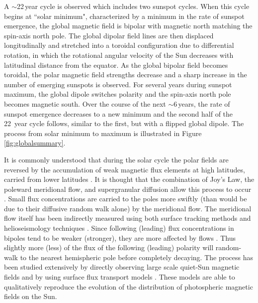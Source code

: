 A $\sim$22\,year cycle is observed which includes two sunspot cycles. When this cycle begins at ``solar minimum", characterized by a minimum in the rate of sunspot emergence,  the global magnetic field is bipolar with magnetic north matching the spin-axis north pole. The global dipolar field lines are then displaced longitudinally and stretched into a toroidal configuration due to differential rotation, in which the rotational angular velocity of the Sun decreases with latitudinal distance from the equator. As the global bipolar field becomes toroidal, the polar magnetic field strengths decrease and a sharp increase in the number of emerging sunspots is observed. For several years during sunspot maximum, the global dipole switches polarity and the spin-axis north pole becomes magnetic south. Over the course of the next $\sim$6\,years, the rate of sunspot emergence decreases to a new minimum and the second half of the 22~year cycle follows, similar to the first, but with a flipped global dipole. The process from solar minimum to maximum is illustrated in Figure\,\ref{fig:globalsummary}.

It is commonly understood that during the solar cycle the polar fields are reversed by the accumulation of weak magnetic flux elements at high latitudes, carried from lower latitudes \citep{Babcock:1961, Leighton:1964}. It is thought that the combination of Joy's Law, the poleward meridional flow, and supergranular diffusion allow this process to occur \citep{Mosher:1977}. Small flux concentrations are carried to the poles more swiftly (than would be due to their diffusive random walk alone) by the meridional flow. The meridional flow itself has been indirectly measured using both surface tracking methods and helioseismology techniques \citep{Hathaway:2010,Haber:2002,Zhao:2004}. Since following (leading) flux concentrations in bipoles tend to be weaker (stronger), they are more affected by flows \citep{Schrijver:1996}. Thus slightly more (less) of the flux of the following (leading) polarity will random-walk to the nearest hemispheric pole before completely decaying. The process has been studied extensively by directly observing large scale quiet-Sun magnetic fields \citep{Harvey:1992,Ulrich:2005,Schrijver:2008b} and by using surface flux transport models \citep{Leighton:1964,Wang:1989,Schrijver:2003}. These models are able to qualitatively reproduce the evolution of the distribution of photospheric magnetic fields on the Sun. 

